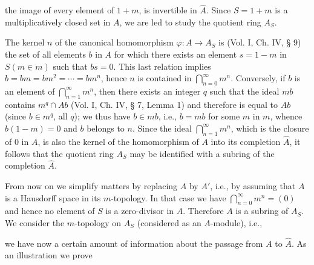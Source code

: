the image of every element of $1 + m$, is invertible in $\hat{A}$. Since $S = 1 + m$ is a multiplicatively closed set in $A$, we are led to study the quotient ring $A_S$.

The kernel $n$ of the canonical homomorphism $\varphi: A \rightarrow A_S$ is (Vol. I, Ch. IV, § 9) the set of all elements $b$ in $A$ for which there exists an element $s = 1 - m$ in $S(m \in m)$ such that $bs = 0$. This last relation implies $b = bm = bm^2 = \cdots = bm^n$, hence $n$ is contained in $\bigcap_{n=0}^{\infty} m^n$. Conversely, if $b$ is an element of $\bigcap_{n=1}^{\infty} m^n$, then there exists an integer $q$ such that the ideal $mb$ contains $m^q \cap Ab$ (Vol. I, Ch. IV, § 7, Lemma 1) and therefore is equal to $Ab$ (since $b \in m^q$, all $q$); we thus have $b \in mb$, i.e., $b = mb$ for some $m$ in $m$, whence $b(1 - m) = 0$ and $b$ belongs to $n$. Since the ideal $\bigcap_{n=1}^{\infty} m^n$, which is the closure of 0 in $A$, is also the kernel of the homomorphism of $A$ into its completion $\hat{A}$, it follows that the quotient ring $A_S$ may be identified with a subring of the completion $\hat{A}$.

From now on we simplify matters by replacing $A$ by $A'$, i.e., by assuming that $A$ is a Hausdorff space in its $m$-topology. In that case we have $\bigcap_{n=0}^{\infty} m^n = (0)$ and hence no element of $S$ is a zero-divisor in $A$. Therefore $A$ is a subring of $A_S$. We consider the $m$-topology on $A_S$ (considered as an $A$-module), i.e.,

we have now a certain amount of information about the passage from $A$ to $\hat{A}$. As an illustration we prove